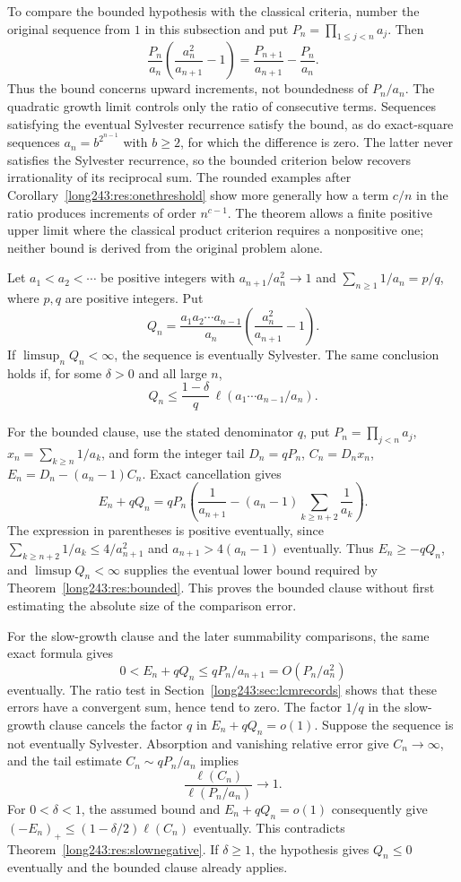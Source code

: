 \documentclass[11pt]{article}
\begin{document}
To compare the bounded hypothesis with the classical criteria, number
the original sequence from $1$ in this subsection and put
$P_n=\prod_{1\le j<n}a_j$. Then
\[
 \frac{P_n}{a_n}\left(\frac{a_n^2}{a_{n+1}}-1\right)
 =\frac{P_{n+1}}{a_{n+1}}-\frac{P_n}{a_n}.
\]
Thus the bound concerns upward increments, not boundedness of $P_n/a_n$.
The quadratic growth limit controls only the ratio of consecutive terms.
Sequences satisfying the eventual Sylvester recurrence satisfy the bound, as do exact-square sequences
$a_n=b^{2^{n-1}}$ with $b\ge2$, for which the difference is zero.
The latter never satisfies the Sylvester recurrence, so the bounded
criterion below recovers irrationality of its reciprocal sum.
The rounded examples after Corollary~\ref{long243:res:onethreshold}
show more generally how a term $c/n$ in the ratio produces increments
of order $n^{c-1}$. The theorem allows a finite positive upper limit
where the classical product criterion requires a nonpositive one;
neither bound is derived from the original problem alone.

\begin{theorem}\label{long243:res:strausbounded}
Let $a_1<a_2<\cdots$ be positive integers with $a_{n+1}/a_n^2\to1$
and $\sum_{n\ge1}1/a_n=p/q$, where $p,q$ are positive integers. Put
\[
 Q_n=\frac{a_1a_2\cdots a_{n-1}}{a_n}
     \left(\frac{a_n^2}{a_{n+1}}-1\right).
\]
If $\limsup_nQ_n<\infty$, the sequence is eventually Sylvester.
The same conclusion holds if, for some $\delta>0$ and all large $n$,
\[
 Q_n\le\frac{1-\delta}{q}\,
 \ell(a_1\cdots a_{n-1}/a_n).
\]
\end{theorem}

For the bounded clause, use the stated denominator $q$, put
$P_n=\prod_{j<n}a_j$, $x_n=\sum_{k\ge n}1/a_k$, and form the integer tail
$D_n=qP_n$, $C_n=D_nx_n$, $E_n=D_n-(a_n-1)C_n$. Exact cancellation gives
\[
 E_n+qQ_n=qP_n\left(\frac1{a_{n+1}}
 -(a_n-1)\sum_{k\ge n+2}\frac1{a_k}\right).
\]
The expression in parentheses is positive eventually, since
$\sum_{k\ge n+2}1/a_k\le4/a_{n+1}^2$ and
$a_{n+1}>4(a_n-1)$ eventually. Thus $E_n\ge-qQ_n$,
and $\limsup Q_n<\infty$ supplies the eventual lower bound required
by Theorem~\ref{long243:res:bounded}. This proves the bounded clause
without first estimating the absolute size of the comparison error.

For the slow-growth clause and the later summability comparisons,
the same exact formula gives
\[
 0<E_n+qQ_n\le qP_n/a_{n+1}=O(P_n/a_n^2)
\]
eventually. The ratio test in Section~\ref{long243:sec:lcmrecords}
shows that these errors have a convergent sum, hence tend to zero.
The factor $1/q$ in the slow-growth clause cancels the factor $q$ in
$E_n+qQ_n=o(1)$. Suppose the sequence is not eventually Sylvester. Absorption
and vanishing relative error give $C_n\to\infty$, and the tail estimate
$C_n\sim qP_n/a_n$ implies
\[
 \frac{\ell(C_n)}{\ell(P_n/a_n)}\longrightarrow1.
\]
For $0<\delta<1$, the assumed bound and $E_n+qQ_n=o(1)$ consequently give
$(-E_n)_+\le(1-\delta/2)\ell(C_n)$ eventually. This contradicts
Theorem~\ref{long243:res:slownegative}. If $\delta\ge1$, the hypothesis gives
$Q_n\le0$ eventually and the bounded clause already applies.
\end{document}
